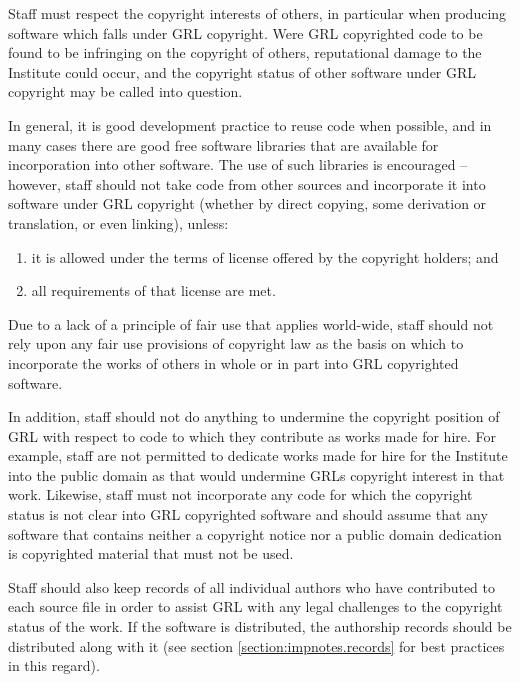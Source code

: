 \documentclass[10pt,a4paper]{article}
\begin{document}
\par Staff must respect the copyright interests of others, in particular when producing 
software which falls under GRL copyright. Were GRL copyrighted code to be found 
to be infringing on the copyright of others, reputational damage to the Institute could 
occur, and the copyright status of other software under GRL copyright may be called 
into question. 

\par In general, it is good development practice to reuse code when possible, and in 
many cases there are good free software libraries that are available for 
incorporation into other software. The use of such libraries is encouraged -- however, 
staff should not take code from other sources and incorporate it into software under 
GRL copyright (whether by direct copying, some derivation or translation, or even 
linking), unless:
\begin{enumerate}
\item it is allowed under the terms of license offered by the copyright holders; and
\item all requirements of that license are met. 
\end{enumerate} 

\par Due to a lack of a principle of fair use that applies world-wide, staff should not 
rely upon any fair use provisions of copyright law as the basis on which to 
incorporate the works of others in whole or in part into GRL copyrighted software. 

\par In addition, staff should not do anything to undermine the copyright position of GRL 
with respect to code to which they contribute as works made for hire. For example, 
staff are not permitted to dedicate works made for hire for the Institute into the 
public domain as that would undermine GRLs copyright interest in that work. 
Likewise, staff must not incorporate any code for which the copyright status is 
not clear into GRL copyrighted software and should assume that any software 
that contains neither a copyright notice nor a public domain dedication is copyrighted 
material that must not be used. 

\par Staff should also keep records of all individual authors who have contributed to 
each source file in order to assist GRL with any legal challenges to the copyright 
status of the work. If the software is distributed, the authorship records should be 
distributed along with it (see section \ref{section:impnotes.records} for best practices 
in this regard). 
\end{document}
